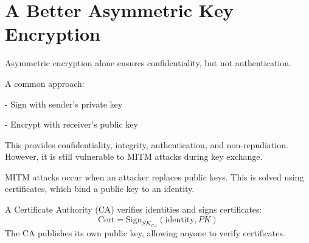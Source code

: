 \section{A Better Asymmetric Key Encryption}
Asymmetric encryption alone ensures confidentiality, but not authentication.

A common approach:

- Sign with sender's private key

- Encrypt with receiver's public key

This provides confidentiality, integrity, authentication, and non-repudiation. However, it is still vulnerable to MITM attacks during key exchange.

MITM attacks occur when an attacker replaces public keys. This is solved using certificates, which bind a public key to an identity.

A Certificate Authority (CA) verifies identities and signs certificates:
\[
  \text{Cert} = \text{Sign}_{SK_{CA}}(\text{identity}, PK)
\]
The CA publishes its own public key, allowing anyone to verify certificates.